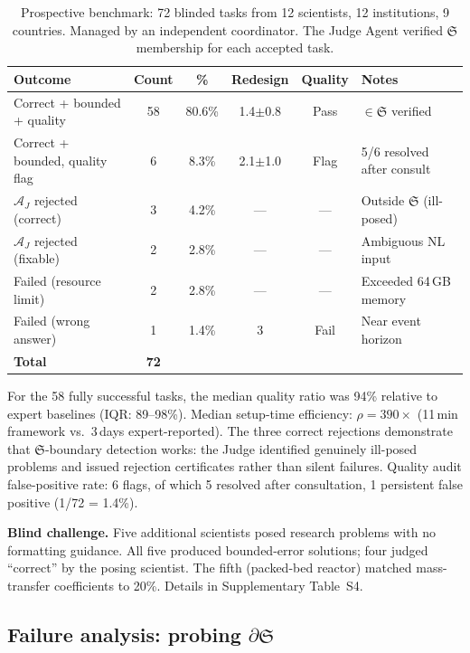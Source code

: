 \documentclass[11pt,a4paper]{article}
\newcommand{\Sclass}{\mathfrak{S}}
\newcommand{\Agent}{\mathcal{A}}
\begin{document}
\begin{table}[htbp]
\centering
\caption{Prospective benchmark: 72 blinded tasks from 12 scientists, 12 institutions, 9 countries. Managed by an independent coordinator. The Judge Agent verified $\Sclass$ membership for each accepted task.}
\label{tab:prospective}
\small
\begin{tabularx}{\textwidth}{Xccccl}
\toprule
\textbf{Outcome} & \textbf{Count} & \textbf{\%} & \textbf{Redesign} & \textbf{Quality} & \textbf{Notes} \\
\midrule
Correct + bounded + quality & 58 & 80.6\% & 1.4$\pm$0.8 & Pass & $\in \Sclass$ verified \\
Correct + bounded, quality flag & 6 & 8.3\% & 2.1$\pm$1.0 & Flag & 5/6 resolved after consult \\
$\Agent_J$ rejected (correct) & 3 & 4.2\% & --- & --- & Outside $\Sclass$ (ill-posed) \\
$\Agent_J$ rejected (fixable) & 2 & 2.8\% & --- & --- & Ambiguous NL input \\
Failed (resource limit) & 2 & 2.8\% & --- & --- & Exceeded 64\,GB memory \\
Failed (wrong answer) & 1 & 1.4\% & 3 & Fail & Near event horizon \\
\midrule
\textbf{Total} & \textbf{72} & & & & \\
\bottomrule
\end{tabularx}
\end{table}

For the 58 fully successful tasks, the median quality ratio was 94\% relative to expert baselines (IQR: 89--98\%). Median setup-time efficiency: $\rho = 390\times$ (11\,min framework vs.\ 3\,days expert-reported). The three correct rejections demonstrate that $\Sclass$-boundary detection works: the Judge identified genuinely ill-posed problems and issued rejection certificates rather than silent failures. Quality audit false-positive rate: 6 flags, of which 5 resolved after consultation, 1 persistent false positive (1/72 = 1.4\%).

\textbf{Blind challenge.} Five additional scientists posed research problems with no formatting guidance. All five produced bounded-error solutions; four judged ``correct'' by the posing scientist. The fifth (packed-bed reactor) matched mass-transfer coefficients to 20\%. Details in Supplementary Table~S4.

\subsection{Failure analysis: probing $\partial \Sclass$}
\label{sec:failure}
\end{document}
